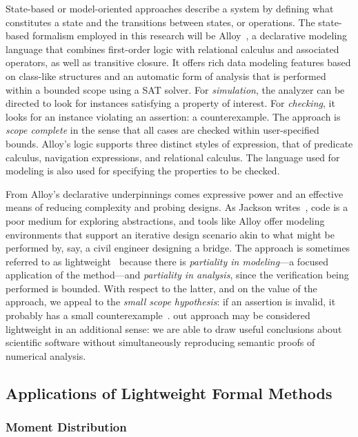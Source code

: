 \documentclass[../../proposal.tex]{subfiles}
\begin{document}
State-based or model-oriented approaches describe a system by defining what constitutes a state and the transitions between states, or operations.  The state-based formalism employed in this research will be Alloy~\cite{jackson2012}, a declarative modeling language that combines first-order logic with relational calculus and associated operators, as well as transitive closure.  It offers rich data modeling features based on class-like structures and an automatic form of analysis that is performed within a bounded scope using a SAT solver.  For \emph{simulation}, the analyzer can be directed to look for instances satisfying a property of interest.  For \emph{checking}, it looks for an instance violating an assertion: a counterexample.  The approach is \emph{scope complete} in the sense that all cases are checked within user-specified bounds.  Alloy's logic supports three distinct styles of expression, that of predicate calculus, navigation expressions, and relational calculus.  The language used for modeling is also used for specifying the properties to be checked.

From Alloy's declarative underpinnings comes expressive power and an effective means of reducing complexity and probing designs.  As Jackson writes~\cite{jackson2012}, code is a poor medium for exploring abstractions, and tools like Alloy offer modeling environments that support an iterative design scenario akin to what might be performed by, say, a civil engineer designing a bridge. The approach is sometimes referred to as lightweight~\cite{} because there is \emph{partiality in modeling}---a focused application of the method---and \emph{partiality in analysis}, since the verification being performed is bounded.  With respect to the latter, and on the value of the approach, we appeal to the \emph{small scope hypothesis}: if an assertion is invalid, it probably has a small counterexample~\cite{}. out approach may be considered lightweight in an additional sense: we are able to draw useful conclusions about scientific software without simultaneously reproducing semantic proofs of numerical analysis.

\subsection{Applications of Lightweight Formal Methods}

\subsubsection{Moment Distribution}
\end{document}
